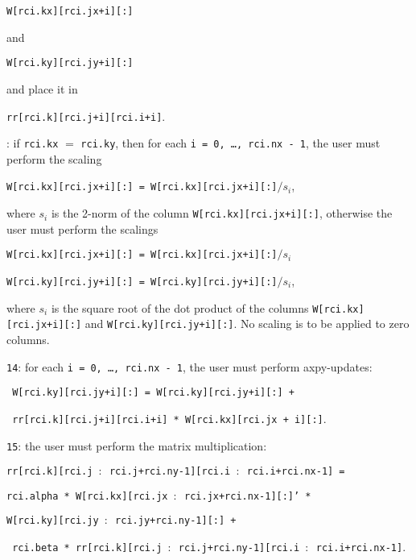 \begin{description}
\begin{description}
\hspace{8mm}
{\tt W[rci.kx][rci.jx+i][:]} 

and

\hspace{8mm}
{\tt W[rci.ky][rci.jy+i][:]}

and place it in 

\hspace{8mm}
{\tt rr[rci.k][rci.j+i][rci.i+i]}.
%
\item[\texttt{13}]: 
if {\tt rci.kx} $=$ {\tt rci.ky}, then
for each
{\tt i = 0, \ldots, rci.nx - 1}, 
the user must perform the scaling

\hspace{8mm}
{\tt W[rci.kx][rci.jx+i][:] = W[rci.kx][rci.jx+i][:]$/s_i$},

where $s_i$ is the 2-norm of the column 
{\tt W[rci.kx][rci.jx+i][:]},
otherwise the user must perform the scalings

\hspace{8mm}
{\tt W[rci.kx][rci.jx+i][:] = W[rci.kx][rci.jx+i][:]$/s_i$}

\hspace{8mm}
{\tt W[rci.ky][rci.jy+i][:] = W[rci.ky][rci.jy+i][:]$/s_i$},

where $s_i$ is the square root of the dot product of 
the columns 
{\tt W[rci.kx][rci.jx+i][:]} and
{\tt W[rci.ky][rci.jy+i][:]}.
No scaling is to be applied to zero columns.
%
\item
{\tt 14}: 
for each {\tt i = 0, \ldots, rci.nx - 1}, 
the user must perform axpy-updates:

\hspace{8mm}
{\tt 
W[rci.ky][rci.jy+i][:] = 
W[rci.ky][rci.jy+i][:] + 
}

\hspace{12mm}
{\tt
rr[rci.k][rci.j+i][rci.i+i] * W[rci.kx][rci.jx + i][:]}.
%
\item
{\tt 15}: the user must perform the matrix multiplication:

\hspace{8mm}
{\tt rr[rci.k][rci.j $:$ rci.j+rci.ny-1][rci.i $:$ rci.i+rci.nx-1] =}

\hspace{12mm}
{\tt rci.alpha *
W[rci.kx][rci.jx $:$ rci.jx+rci.nx-1][:]' *}

\hspace{16mm}
{\tt W[rci.ky][rci.jy $:$ rci.jy+rci.ny-1][:] +}

\hspace{12mm}
{\tt 
rci.beta *
rr[rci.k][rci.j $:$ rci.j+rci.ny-1][rci.i $:$ rci.i+rci.nx-1]}.


\end{description}
\end{description}

